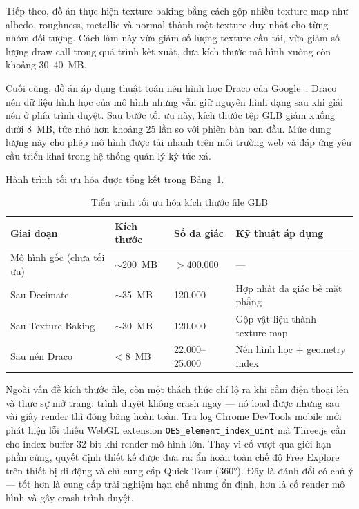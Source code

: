 \documentclass[../DoAn.tex]{subfiles}
\begin{document}
Tiếp theo, đồ án thực hiện texture baking bằng cách gộp nhiều texture map như
albedo, roughness, metallic và normal thành một texture duy nhất cho từng nhóm
đối tượng. Cách làm này vừa giảm số lượng texture cần tải, vừa giảm số lượng
draw call trong quá trình kết xuất, đưa kích thước mô hình xuống còn khoảng
30--40~MB.

Cuối cùng, đồ án áp dụng thuật toán nén hình học Draco của
Google~\cite{google2023draco}. Draco nén dữ liệu hình học của mô hình nhưng
vẫn giữ nguyên hình dạng sau khi giải nén ở phía trình duyệt. Sau bước tối ưu
này, kích thước tệp GLB giảm xuống dưới 8~MB, tức nhỏ hơn khoảng 25 lần so với
phiên bản ban đầu. Mức dung lượng này cho phép mô hình được tải nhanh trên môi
trường web và đáp ứng yêu cầu triển khai trong hệ thống quản lý ký túc xá.


Hành trình tối ưu hóa được tổng kết trong Bảng~\ref{tab:glb_optimization}.

\begin{table}[H]
\centering
\caption{Tiến trình tối ưu hóa kích thước file GLB}
\label{tab:glb_optimization}
\small
\begin{tabular}{|p{4.2cm}|p{2.2cm}|p{2.5cm}|p{4.3cm}|}
\hline
\textbf{Giai đoạn} & \textbf{Kích thước} & \textbf{Số đa giác} & \textbf{Kỹ thuật áp dụng} \\
\hline
Mô hình gốc (chưa tối ưu) & $\sim$200~MB & $>$400.000 & --- \\
\hline
Sau Decimate & $\sim$35~MB & 120.000 & Hợp nhất đa giác bề mặt phẳng \\
\hline
Sau Texture Baking & $\sim$30~MB & 120.000 & Gộp vật liệu thành texture map \\
\hline
Sau nén Draco & < 8~MB & 22.000--25.000 & Nén hình học + geometry index \\
\hline
\end{tabular}
\end{table}

Ngoài vấn đề kích thước file, còn một thách thức chỉ lộ ra khi cầm điện thoại
lên và thực sự mở trang: trình duyệt không crash ngay --- nó load được nhưng
sau vài giây render thì đóng băng hoàn toàn. Tra log Chrome DevTools mobile
mới phát hiện lỗi thiếu WebGL extension \texttt{OES\allowbreak\_element\allowbreak\_index\allowbreak\_uint}
mà Three.js cần cho index buffer 32-bit khi render mô hình lớn. Thay vì cố
vượt qua giới hạn phần cứng, quyết định thiết kế được đưa ra: ẩn hoàn toàn
chế độ Free Explore trên thiết bị di động và chỉ cung cấp Quick Tour (360°).
Đây là đánh đổi có chủ ý --- tốt hơn là cung cấp trải nghiệm hạn chế nhưng
ổn định, hơn là cố render mô hình và gây crash trình duyệt.
\end{document}
